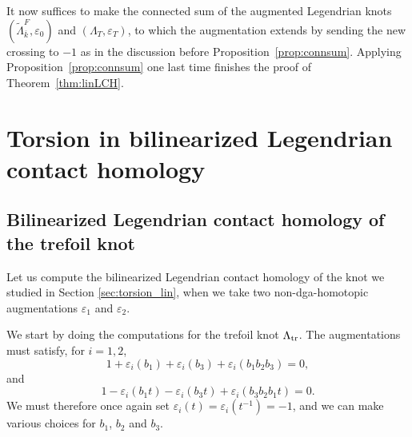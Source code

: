 \documentclass[11pt]{amsart}
\theoremstyle{plain}
\theoremstyle{remark}
\numberwithin{equation}{section}
\begin{document}
It now suffices to make the connected sum of the augmented Legendrian knots $(\widetilde{\Lambda}^F_{\overline{k}}, \varepsilon_0)$ and
$(\Lambda_T, \varepsilon_T)$, to which the augmentation extends by sending the new crossing to $-1$ as in the discussion before Proposition~\ref{prop:connsum}. Applying Proposition~\ref{prop:connsum} one last time finishes the proof of Theorem~\ref{thm:linLCH}.


\section{Torsion in bilinearized Legendrian contact homology}
\label{sec:torsion_bilin}

\subsection{Bilinearized Legendrian contact homology of the trefoil knot}\label{subsec:trefoil_bi}
Let us compute the bilinearized Legendrian contact homology of the knot we studied in Section \ref{sec:torsion_lin}, when we take two non-dga-homotopic augmentations $\varepsilon_1$ and $\varepsilon_2$. 

We start by doing the computations for the trefoil knot $\Lambda_{\rm tr}$. The augmentations must satisfy, for $i=1,2$, $$1+\varepsilon_i(b_1)+\varepsilon_i(b_3)+\varepsilon_i(b_1b_2b_3)=0,$$ and $$1-\varepsilon_i(b_1t)-\varepsilon_i(b_3t)+\varepsilon_i(b_3b_2b_1t)=0.$$
We must therefore once again set $\varepsilon_i(t)=\varepsilon_i(t^{-1})=-1$, and we can make various choices for $b_1$, $b_2$ and $b_3$.
\end{document}
